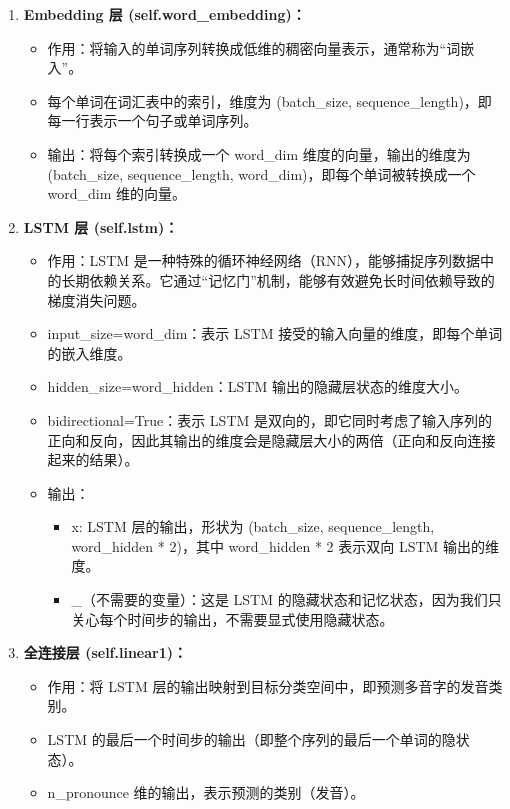 \documentclass[12pt,hyperref,a4paper,UTF8]{ctexart}
\begin{document}
\begin{enumerate}
  \item \textbf{Embedding 层 (self.word\_embedding)：}
  \begin{itemize}
  \item 作用：将输入的单词序列转换成低维的稠密向量表示，通常称为“词嵌入”。
  \item 每个单词在词汇表中的索引，维度为 (batch\_size, sequence\_length)，即每一行表示一个句子或单词序列。
  \item 输出：将每个索引转换成一个 word\_dim 维度的向量，输出的维度为 (batch\_size, sequence\_length, word\_dim)，即每个单词被转换成一个 word\_dim 维的向量。
\end{itemize}
  \item \textbf{LSTM 层 (self.lstm)：}
  \begin{itemize}
  \item 作用：LSTM 是一种特殊的循环神经网络（RNN），能够捕捉序列数据中的长期依赖关系。它通过“记忆门”机制，能够有效避免长时间依赖导致的梯度消失问题。
  \item input\_size=word\_dim：表示 LSTM 接受的输入向量的维度，即每个单词的嵌入维度。
  \item hidden\_size=word\_hidden：LSTM 输出的隐藏层状态的维度大小。
  \item bidirectional=True：表示 LSTM 是双向的，即它同时考虑了输入序列的正向和反向，因此其输出的维度会是隐藏层大小的两倍（正向和反向连接起来的结果）。
  \item 输出：
  \begin{itemize}
  \item x: LSTM 层的输出，形状为 (batch\_size, sequence\_length, word\_hidden * 2)，其中 word\_hidden * 2 表示双向 LSTM 输出的维度。
  \item \_（不需要的变量）：这是 LSTM 的隐藏状态和记忆状态，因为我们只关心每个时间步的输出，不需要显式使用隐藏状态。
  \end{itemize}
\end{itemize}
  \item \textbf{全连接层 (self.linear1)：}
  \begin{itemize}
  \item 作用：将 LSTM 层的输出映射到目标分类空间中，即预测多音字的发音类别。
  \item LSTM 的最后一个时间步的输出（即整个序列的最后一个单词的隐状态）。
  \item n\_pronounce 维的输出，表示预测的类别（发音）。
\end{itemize}
\end{enumerate}
\end{document}
